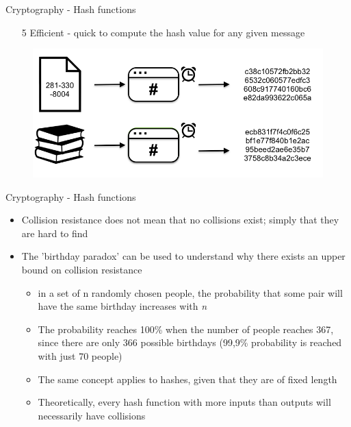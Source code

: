 \documentclass[10pt]{beamer}
\begin{document}

\begin{frame}{Cryptography - Hash functions}
	\begin{enumerate}
		\item[5] Efficient - quick to compute the hash value for any given message
	\end{enumerate}
	\begin{figure}[]
		\centering
		\includegraphics  [scale=0.3]{Images/hash5}
		\begin{centering}
		\end{centering}
	\end{figure}
\end{frame}



\begin{frame}{Cryptography - Hash functions}
	\begin{itemize}
		\item Collision resistance does not mean that no collisions exist; simply that they are hard to find
		\item The 'birthday paradox' can be used to understand why there exists an upper bound on collision resistance
		\begin{itemize}
			\item in a set of n randomly chosen people, the probability that some pair will have the same birthday increases with \textit{n}
			\item The probability reaches 100\% when the number of people reaches 367, since there are only 366 possible birthdays (99,9\% probability is reached with just 70 people)
			\item The same concept applies to hashes, given that they are of fixed length
			\item Theoretically, every hash function with more inputs than outputs will necessarily have collisions
		\end{itemize}
	\end{itemize}
\end{frame}
\end{document}
